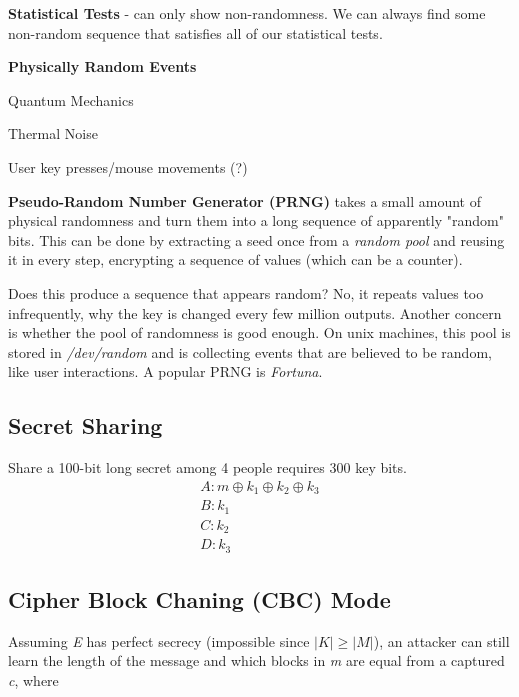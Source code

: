 \documentclass[12pt]{article}
\begin{document}
\textbf{Statistical Tests} - can only show non-randomness. We can always find some non-random sequence that satisfies all of our statistical tests.

\textbf{Physically Random Events}\begin{list}{*}{
\setlength{\itemsep}{0pt}
\setlength{\parsep}{0pt}
\setlength{\topsep}{0pt}
\setlength{\partopsep}{0pt}
\setlength{\leftmargin}{2em}
\setlength{\labelwidth}{1.5em}
\setlength{\labelsep}{0.5em}
}
\item Quantum Mechanics
\item Thermal Noise
\item User key presses/mouse movements (?)
\end{list}

\textbf{Pseudo-Random Number Generator (PRNG)} takes a small amount of physical randomness and turn them into a long sequence of apparently "random" bits. This can be done by extracting a seed once from a \emph{random pool} and reusing it in every step, encrypting a sequence of values (which can be a counter).

Does this produce a sequence that appears random? No, it repeats values too infrequently, why the key is changed every few million outputs. Another concern is whether the pool of randomness is good enough. On unix machines, this pool is stored in \emph{/dev/random} and is collecting events that are believed to be random, like user interactions. A popular PRNG is \emph{Fortuna}.

\subsection{Secret Sharing}

Share a 100-bit long secret among 4 people requires 300 key bits.
\begin{equation}
\begin{split}
A: m \oplus k_1 \oplus k_2 \oplus k_3 \\
B: k_1 \\
C: k_2 \\
D: k_3
\end{split}
\end{equation}
 
\subsection*{Cipher Block Chaning (CBC) Mode}

Assuming \emph{E} has perfect secrecy (impossible since $|K| \ge |M|$), an attacker can still learn the length of the message and which blocks in \emph{m} are equal from a captured \emph{c}, where
\end{document}

